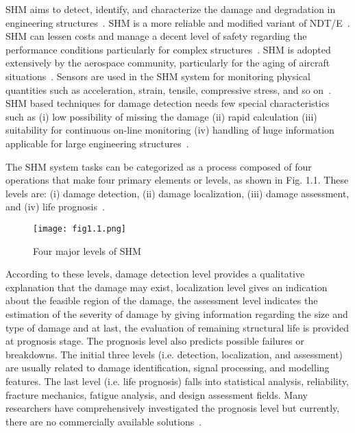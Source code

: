 \documentclass[b5paper, 11pt, titlepage]{book}
\begin{document}
SHM aims to detect, identify, and characterize the damage and degradation in engineering structures~\cite{gopalakrishnan2011computational}. SHM is a more reliable and modified variant of NDT/E~\cite{jawaid2018structural}. SHM can lessen costs and manage a decent level of safety regarding the performance conditions particularly for complex structures~\cite{Balageas2010}. SHM is adopted extensively by the aerospace community, particularly for the aging of aircraft situations~\cite{chang2002introduction}. Sensors are used in the SHM system for monitoring physical quantities such as acceleration, strain, tensile, compressive stress, and so on~\cite{Lamonaca2018}. SHM based techniques for damage detection needs few special characteristics such as (i) low possibility of missing the damage (ii) rapid calculation (iii) suitability for continuous on-line monitoring (iv) handling of huge information applicable for large engineering structures~\cite{lee2008overview}.

The SHM system tasks can be categorized as a process composed of four operations that make four primary elements or levels, as shown in Fig. 1.1. These levels are: (i) damage detection, (ii) damage localization, (iii) damage assessment, and (iv) life prognosis~\cite{stepinski2013advanced,TibaduizaBurgos2020}. 
\begin{figure} [h!]
	\begin{center}
		\centering
		\texttt{[image: fig1.1.png]}
	\end{center}
	\caption{Four major levels of SHM} 
	\label{fig:fig1.1}
\end{figure}

According to these levels, damage detection level provides a qualitative explanation that the damage may exist, localization level gives an indication about the feasible region of the damage, the assessment level indicates the estimation of the severity of damage by giving information regarding the size and type of damage and at last, the evaluation of remaining structural life is provided at prognosis stage. The prognosis level also predicts possible failures or breakdowns. The initial three levels (i.e. detection, localization, and assessment) are usually related to damage identification, signal processing, and modelling features. The last level (i.e. life prognosis) falls into statistical analysis, reliability, fracture mechanics, fatigue analysis, and design assessment fields. Many researchers have comprehensively investigated the prognosis level but currently, there are no commercially available solutions~\cite{stepinski2013advanced, TibaduizaBurgos2020}. 
\end{document}
